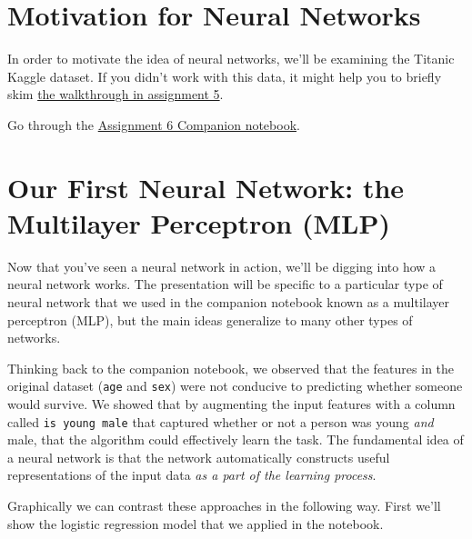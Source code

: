 \documentclass[assignment06_Solutions]{subfiles}
\begin{document}
\section{Motivation for Neural Networks}

In order to motivate the idea of neural networks, we'll be examining the Titanic Kaggle dataset.  If you didn't work with this data, it might help you to briefly skim \href{https://colab.research.google.com/github/mlfa19/assignments/blob/master/Module\%201/05/assignment05.ipynb#scrollTo=56C4fPtK7YeQ}{the walkthrough in assignment 5}.

\vspace{1em}
\begin{externalresources}[(45 minutes)]
Go through the \href{https://colab.research.google.com/github/mlfa19/assignments/blob/master/Module\%201/06/Assignment_6_Companion.ipynb}{Assignment 6 Companion notebook}.
\end{externalresources}

\section{Our First Neural Network: the Multilayer Perceptron (MLP)}

Now that you've seen a neural network in action, we'll be digging into how a neural network works.  The presentation will be specific to a particular type of neural network that we used in the companion notebook known as a multilayer perceptron (MLP), but the main ideas generalize to many other types of networks.

Thinking back to the companion notebook, we observed that the features in the original dataset ({\tt age} and {\tt sex}) were not conducive to predicting whether someone would survive.  We showed that by augmenting the input features with a column called {\tt is young male} that captured whether or not a person was young \emph{and} male, that the algorithm could effectively learn the task.  The fundamental idea of a neural network is that the network automatically constructs useful representations of the input data \emph{as a part of the learning process}.

Graphically we can contrast these approaches in the following way.  First we'll show the logistic regression model that we applied in the notebook.
\end{document}
